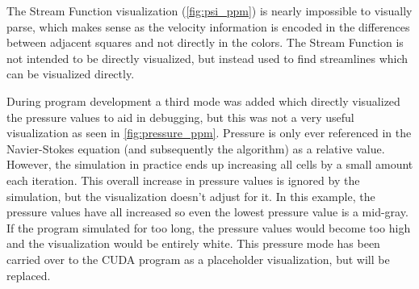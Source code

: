 The Stream Function visualization (\cref{fig:psi_ppm}) is nearly impossible to visually parse, which makes sense as the velocity information is encoded in the differences between adjacent squares and not directly in the colors.
The Stream Function is not intended to be directly visualized, but instead used to find streamlines which can be visualized directly.

\label{sec:VizPressureCritique}
During program development a third mode was added which directly visualized the pressure values to aid in debugging, but this was not a very useful visualization as seen in \cref{fig:pressure_ppm}.
Pressure is only ever referenced in the Navier-Stokes equation (and subsequently the algorithm) as a relative value.
However, the simulation in practice ends up increasing all cells by a small amount each iteration.
This overall increase in pressure values is ignored by the simulation, but the visualization doesn't adjust for it.
In this example, the pressure values have all increased so even the lowest pressure value is a mid-gray.
If the program simulated for too long, the pressure values would become too high and the visualization would be entirely white.
This pressure mode has been carried over to the CUDA program as a placeholder visualization, but will be replaced.